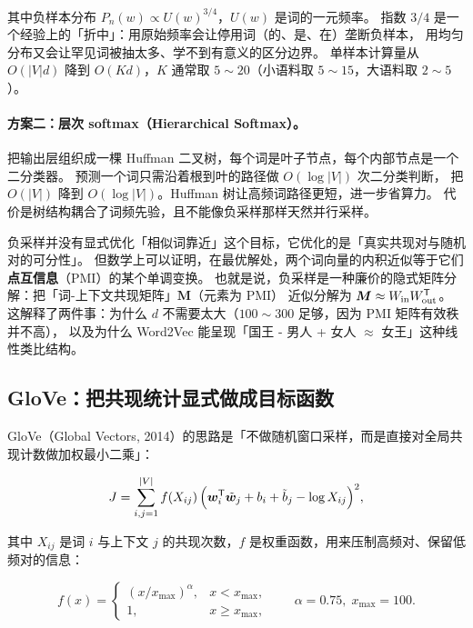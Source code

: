 其中负样本分布 $P_n(w) \propto U(w)^{3/4}$，$U(w)$ 是词的一元频率。
指数 $3/4$ 是一个经验上的「折中」：用原始频率会让停用词（的、是、在）垄断负样本，
用均匀分布又会让罕见词被抽太多、学不到有意义的区分边界。
单样本计算量从 $O(|V| d)$ 降到 $O(K d)$，$K$ 通常取 $5 \sim 20$（小语料取 $5 \sim 15$，大语料取 $2 \sim 5$）。

\paragraph{方案二：层次 softmax（Hierarchical Softmax）。}
把输出层组织成一棵 Huffman 二叉树，每个词是叶子节点，每个内部节点是一个二分类器。
预测一个词只需沿着根到叶的路径做 $O(\log |V|)$ 次二分类判断，
把 $O(|V|)$ 降到 $O(\log |V|)$。Huffman 树让高频词路径更短，进一步省算力。
代价是树结构耦合了词频先验，且不能像负采样那样天然并行采样。

\begin{insight}
负采样并没有显式优化「相似词靠近」这个目标，它优化的是「真实共现对与随机对的可分性」。
但数学上可以证明，在最优解处，两个词向量的内积近似等于它们\textbf{点互信息}（PMI）的某个单调变换。
也就是说，负采样是一种廉价的隐式矩阵分解：把「词-上下文共现矩阵」$\bm{M}$（元素为 PMI）
近似分解为 $\bm{M} \approx W_{\text{in}} W_{\text{out}}^{\mathsf{T}}$。
这解释了两件事：为什么 $d$ 不需要太大（$100 \sim 300$ 足够，因为 PMI 矩阵有效秩并不高），
以及为什么 Word2Vec 能呈现「国王 - 男人 + 女人 $\approx$ 女王」这种线性类比结构。
\end{insight}

\subsection{GloVe：把共现统计显式做成目标函数}

GloVe（Global Vectors, 2014）的思路是「不做随机窗口采样，而是直接对全局共现计数做加权最小二乘」\cite{pennington2014glove}：

\begin{equation}
J = \sum_{i,j=1}^{|V|} f(X_{ij}) \, \Big( \bm{w}_i^{\mathsf{T}} \tilde{\bm{w}}_j + b_i + \tilde{b}_j - \log X_{ij} \Big)^2 ,
\label{eq:glove}
\end{equation}

其中 $X_{ij}$ 是词 $i$ 与上下文 $j$ 的共现次数，$f$ 是权重函数，用来压制高频对、保留低频对的信息：

$$f(x) = \begin{cases} (x / x_{\max})^{\alpha}, & x < x_{\max}, \\ 1, & x \ge x_{\max}, \end{cases}
\qquad \alpha = 0.75,\; x_{\max} = 100 .$$

